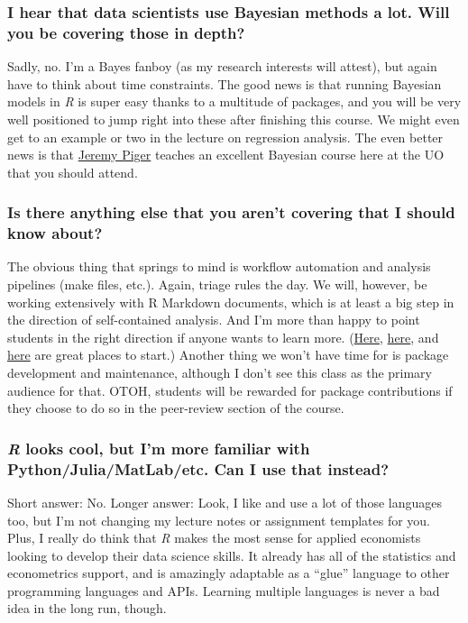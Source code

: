\documentclass[12]{article}
\begin{document}
\vspace{-0.25cm}
\subsubsection*{I hear that data scientists use Bayesian methods a lot. Will you be covering those in depth?}
Sadly, no. I'm a Bayes fanboy (as my research interests will attest), but again have to think about time constraints. The good news is that running Bayesian models in \textit{R} is super easy thanks to a multitude of packages, and you will be very well positioned to jump right into these after finishing this course. We might even get to an example or two in the lecture on regression analysis. The even better news is that \href{https://pages.uoregon.edu/jpiger/}{Jeremy Piger} teaches an excellent Bayesian course here at the UO that you should attend.

\vspace{-0.25cm}
\subsubsection*{Is there anything else that you aren't covering that I should know about?}
The obvious thing that springs to mind is workflow automation and analysis pipelines (make files, etc.). Again, triage rules the day. We will, however, be working extensively with R Markdown documents, which is at least a big step in the direction of self-contained analysis. And I'm more than happy to point students in the right direction if anyone wants to learn more. (\href{http://stat545.com/Classroom/notes/cm109.nb.html}{Here}, \href{https://ropenscilabs.github.io/drake-manual/index.html}{here}, and \href{https://web.stanford.edu/~gentzkow/research/CodeAndData.pdf}{here} are great places to start.) Another thing we won't have time for is package development and maintenance, although I don't see this class as the primary audience for that. OTOH, students will be rewarded for package contributions if they choose to do so in the peer-review section of the course. 

\vspace{-0.25cm}
\subsubsection*{\textit{R} looks cool, but I'm more familiar with Python/Julia/MatLab/etc. Can I use that instead?}
Short answer: No. Longer answer: Look, I like and use a lot of those languages too, but I'm not changing my lecture notes or assignment templates for you. Plus, I really do think that \textit{R} makes the most sense for applied economists looking to develop their data science skills. It already has all of the statistics and econometrics support, and is amazingly adaptable as a ``glue'' language to other programming languages and APIs. Learning multiple languages is never a bad idea in the long run, though.
\end{document}
